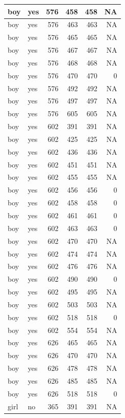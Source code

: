 \documentclass[man]{apa6}
\begin{document}
\begin{tabular}{l|l|r|r|r|r}
\hline
boy & yes & 576 & 458 & 458 & NA\\
\hline
boy & yes & 576 & 463 & 463 & NA\\
\hline
boy & yes & 576 & 465 & 465 & NA\\
\hline
boy & yes & 576 & 467 & 467 & NA\\
\hline
boy & yes & 576 & 468 & 468 & NA\\
\hline
boy & yes & 576 & 470 & 470 & 0\\
\hline
boy & yes & 576 & 492 & 492 & NA\\
\hline
boy & yes & 576 & 497 & 497 & NA\\
\hline
boy & yes & 576 & 605 & 605 & NA\\
\hline
boy & yes & 602 & 391 & 391 & NA\\
\hline
boy & yes & 602 & 425 & 425 & NA\\
\hline
boy & yes & 602 & 436 & 436 & NA\\
\hline
boy & yes & 602 & 451 & 451 & NA\\
\hline
boy & yes & 602 & 455 & 455 & NA\\
\hline
boy & yes & 602 & 456 & 456 & 0\\
\hline
boy & yes & 602 & 458 & 458 & 0\\
\hline
boy & yes & 602 & 461 & 461 & 0\\
\hline
boy & yes & 602 & 463 & 463 & 0\\
\hline
boy & yes & 602 & 470 & 470 & NA\\
\hline
boy & yes & 602 & 474 & 474 & NA\\
\hline
boy & yes & 602 & 476 & 476 & NA\\
\hline
boy & yes & 602 & 490 & 490 & 0\\
\hline
boy & yes & 602 & 495 & 495 & NA\\
\hline
boy & yes & 602 & 503 & 503 & NA\\
\hline
boy & yes & 602 & 518 & 518 & 0\\
\hline
boy & yes & 602 & 554 & 554 & NA\\
\hline
boy & yes & 626 & 465 & 465 & NA\\
\hline
boy & yes & 626 & 470 & 470 & NA\\
\hline
boy & yes & 626 & 478 & 478 & NA\\
\hline
boy & yes & 626 & 485 & 485 & NA\\
\hline
boy & yes & 626 & 518 & 518 & 0\\
\hline
girl & no & 365 & 391 & 391 & NA\\

\end{tabular}
\end{document}

